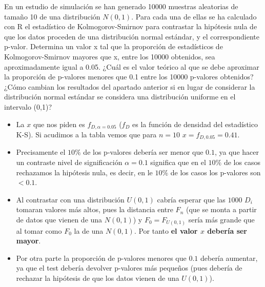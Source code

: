 \begin{problem}[12] En un estudio de simulación se han generado 10000 muestras aleatorias de tamaño 10 de una
distribución $N(0,1)$. Para cada una de ellas se ha calculado con R el estadístico de Kolmogorov-Smirnov
para contrastar la hipótesis nula de que los datos proceden de una distribución normal
estándar, y el correspondiente p-valor.
\ppart
Determina un valor x tal que la proporción de estadísticos de Kolmogorov-Smirnov mayores
que x, entre los 10000 obtenidos, sea aproximadamente igual a 0.05. ¿Cuál es el valor teórico al que
se debe aproximar la proporción de p-valores menores que 0.1 entre los 10000 p-valores obtenidos?
\ppart
¿Cómo cambian los resultados del apartado anterior si en lugar de considerar la distribución
normal estándar se considera una distribución uniforme en el intervalo (0,1)?
\solution


\spart
\begin{itemize}
	\item La $x$ que nos piden es $f_{D,α=0.05}$ ($f_D$ es la función de densidad del estadístico K-S). Si acudimos a la tabla vemos que para $n=10$ $x = f_{D,0.05} = 0.41$.
	\item Precisamente el $10\%$ de los p-valores debería ser menor que $0.1$, ya que hacer un contraste nivel de significación $α=0.1$ significa que en el $10\%$ de los casos rechazamos la hipótesis nula, es decir, en le $10\%$ de los casos los p-valores son $<0.1$.
\end{itemize}

\spart
\begin{itemize}
	\item Al contrastar con una distribución $U(0,1)$ cabría esperar que las $1000$ $D_i$ tomaran valores más altos, pues la distancia entre $F_n$ (que se monta a partir de datos que vienen de una $N(0,1)$) y $F_0=F_{U(0,1)}$ sería más grande que al tomar como $F_0$ la de una $N(0,1)$. Por tanto \textbf{el valor $x$ debería ser mayor}.

	\item Por otra parte la proporción de p-valores menores que $0.1$ debería aumentar, ya que el test debería devolver p-valores más pequeños (pues debería de rechazar la hipótesis de que los datos vienen de una $U(0,1)$).
\end{itemize}

\end{problem}